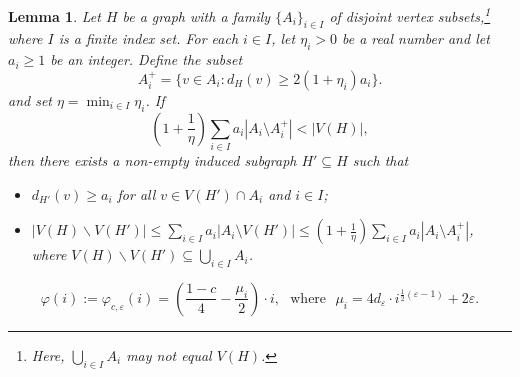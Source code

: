 \documentclass[10pt,a4paper]{amsart}
\newtheorem{lemma}{Lemma}
\begin{document}
	\begin{lemma}\label{Lem:key}
		Let $H$ be a graph with a family $\{A_i\}_{i \in I}$ of disjoint vertex subsets,\footnote{Here, $\bigcup_{i \in I} A_i$ may not equal $V(H)$.} where $I$ is a finite index set.
		For each $i \in I$, let $\eta_i > 0$ be a real number and let $a_i \geq 1$ be an integer. Define the subset
		\[
		A_i^+ = \{v \in A_i : d_H(v) \geq 2(1+\eta_i)a_i\}.
		\]
		and set $\eta = \min_{i \in I} \eta_i$. If
		\begin{equation}\label{equ:key}
			\left(1 + \frac{1}{\eta}\right) \sum_{i \in I} a_i |A_i \setminus A_i^+| < |V(H)|,
		\end{equation}
		then there exists a non-empty induced subgraph $H' \subseteq H$ such that
		\begin{itemize}
			\item [(a)] $d_{H'}(v) \geq a_i$ for all $v \in V(H') \cap A_i$ and $i\in I$;
			\item [(b)] $|V(H)\backslash V(H')| \leq \sum_{i \in I} a_i |A_i \setminus V(H')| \leq \left(1 + \frac{1}{\eta}\right) \sum_{i \in I} a_i |A_i \setminus A_i^+|$, where $V(H)\backslash V(H')\subseteq \bigcup_{i \in I} A_i$.
		\end{itemize}
	\end{lemma}

	\begin{equation}\label{equ:phi2}
		\varphi(i):=\varphi_{c,\varepsilon}(i)=\left(\frac{1-c}{4}-\frac{\mu_i}{2}\right)\cdot i, \mbox{~~where~~} \mu_i=4d_\varepsilon\cdot i^{\frac{1}{2}(\varepsilon-1)}+2\varepsilon.
	\end{equation}
\end{document}
